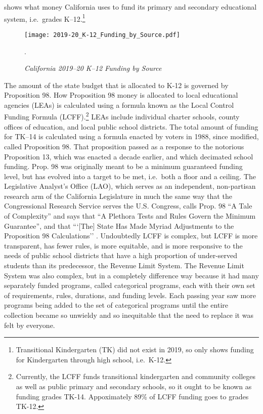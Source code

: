 shows what money California uses to fund its primary and secondary educational system, i.e.~grades K–12.\footnote{Transitional Kindergarten (TK) did not exist in 2019, so  only shows funding  for Kindergarten through high school, i.e.~K-12.}
\begin{figure}[hbt]
  \centering
  \caption[California 2019–20 K–12 Funding by Source]{\textit{California 2019–20 K–12 Funding by Source}}\label{fig:2019–20_K–12_Funding}
  \texttt{[image: 2019-20\_K-12\_Funding\_by\_Source.pdf]}\\ %
  \footnotesize\raggedright\textcite{LAO2021}.
\end{figure}
The amount of the state budget that is allocated to K-12 is governed by Proposition 98. How Proposition 98 money is allocated to local educational agencies (LEAs) is calculated using a formula known as the Local Control Funding Formula (LCFF).\footnote{Currently, the LCFF funds transitional kindergarten and community colleges as well as public primary and secondary schools, so it ought to be known as funding grades TK-14. Appoximately 89\% of LCFF funding goes to grades TK-12.} LEAs include individual charter schools, county offices of education, and local public school districts. The total amount of funding for TK–14 is calculated using a formula enacted by voters in 1988, since modified, called Proposition 98. That proposition passed as a response to the notorious Proposition 13, which was enacted a decade earlier, and which decimated school funding. Prop. 98 was originally meant to be a minimum guaranteed funding level, but has evolved into a target to be met, i.e.~both a floor and a ceiling. The Legislative Analyst's Office (LAO), which serves as an independent, non-partisan research arm of the California Legislature in much the same way that the Congressional Research Service serves the U.S. Congress, calls Prop. 98 ``A Tale of Complexity''  and says that ``A Plethora Tests and Rules Govern the Minimum Guarantee'', and that ```[The] State Has Made Myriad Adjustments to the Proposition 98 Calculations'' \parencite[5]{LAO2017}.
Undoubtedly LCFF is complex, but LCFF is more transparent, has fewer rules, is more equitable, and is more responsive to the needs of public school districts that have a high proportion of under-served students than its predecessor, the Revenue Limit System. The Revenue Limit System was also complex, but in a completely difference way because it had many separately funded programs, called categorical programs, each with their own set of requirements, rules, durations, and funding levels. Each passing year saw more programs being added to the set of categorical programs until the entire collection became so unwieldy and so inequitable that the need to replace it was felt by everyone.

